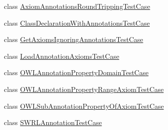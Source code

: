 \begin{DoxyCompactItemize}
\item 
class \hyperlink{classorg_1_1semanticweb_1_1owlapi_1_1api_1_1test_1_1annotations_1_1_axiom_annotations_round_tripping_test_case}{Axiom\-Annotations\-Round\-Tripping\-Test\-Case}
\item 
class \hyperlink{classorg_1_1semanticweb_1_1owlapi_1_1api_1_1test_1_1annotations_1_1_class_declaration_with_annotations_test_case}{Class\-Declaration\-With\-Annotations\-Test\-Case}
\item 
class \hyperlink{classorg_1_1semanticweb_1_1owlapi_1_1api_1_1test_1_1annotations_1_1_get_axioms_ignoring_annotations_test_case}{Get\-Axioms\-Ignoring\-Annotations\-Test\-Case}
\item 
class \hyperlink{classorg_1_1semanticweb_1_1owlapi_1_1api_1_1test_1_1annotations_1_1_load_annotation_axioms_test_case}{Load\-Annotation\-Axioms\-Test\-Case}
\item 
class \hyperlink{classorg_1_1semanticweb_1_1owlapi_1_1api_1_1test_1_1annotations_1_1_o_w_l_annotation_property_domain_test_case}{O\-W\-L\-Annotation\-Property\-Domain\-Test\-Case}
\item 
class \hyperlink{classorg_1_1semanticweb_1_1owlapi_1_1api_1_1test_1_1annotations_1_1_o_w_l_annotation_property_range_axiom_test_case}{O\-W\-L\-Annotation\-Property\-Range\-Axiom\-Test\-Case}
\item 
class \hyperlink{classorg_1_1semanticweb_1_1owlapi_1_1api_1_1test_1_1annotations_1_1_o_w_l_sub_annotation_property_of_axiom_test_case}{O\-W\-L\-Sub\-Annotation\-Property\-Of\-Axiom\-Test\-Case}
\item 
class \hyperlink{classorg_1_1semanticweb_1_1owlapi_1_1api_1_1test_1_1annotations_1_1_s_w_r_l_annotation_test_case}{S\-W\-R\-L\-Annotation\-Test\-Case}
\end{DoxyCompactItemize}
